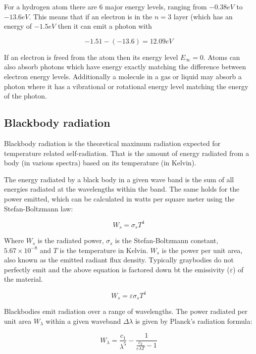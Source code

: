 For a hydrogen atom there are 6 major energy levels, ranging from $-0.38eV$ to $-13.6eV$. This means that if an electron is in the $n=3$ layer (which has an energy of $-1.5eV$ then it can emit a photon with 

\begin{equation}
	-1.51 - (-13.6) = 12.09eV
\end{equation}

If an electron is freed from the atom then its energy level $E_\infty = 0$. Atoms can also absorb photons which have energy exactly matching the difference between electron energy levels. Additionally a molecule in a gas or liquid may absorb a photon where it has a vibrational or rotational energy level matching the energy of the photon.

\subsection{Blackbody radiation}

Blackbody radiation is the theoretical maximum radiation expected for temperature related self-radiation. That is the amount of energy radiated from a body (in various spectra) based on its temperature (in Kelvin).

The energy radiated by a black body in a given wave band is the sum of all energies radiated at the wavelengths within the band. The same holds for the power emitted, which can be calculated in watts per square meter using the Stefan-Boltzmann law:

\begin{equation}
W_s = \sigma_sT^4
\end{equation}

Where $W_s$ is the radiated power, $\sigma_s$ is the Stefan-Boltzmann constant, $5.67\times10^{-8}$ and $T$ is the temperature in Kelvin. $W_s$ is the power per unit area, also known as the emitted radiant flux density. Typically graybodies do not perfectly emit and the above equation is factored down bt the emissivity ($\varepsilon$) of the material.

\begin{equation}
W_s = \varepsilon\sigma_sT^4
\end{equation}

Blackbodies emit radiation over a range of wavelengths. The power radiated per unit area $W_\lambda$ within a given waveband $\Delta\lambda$ is given by Planck's radiation formula:

\begin{equation}
W_\lambda = \frac{c_1}{\lambda^5} - \frac{1}{\frac{c_2}{e\lambda T}-1}
\end{equation}

